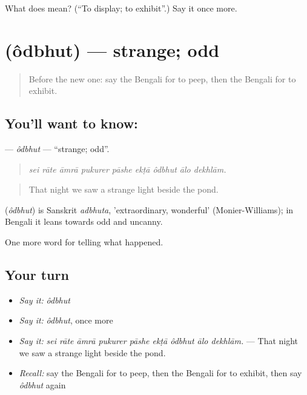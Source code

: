 \begin{tcolorbox}[breakable,colback=teal!4,colframe=teal!35!black,title={Before you move on}]
What does   mean? (\textquotedblleft{}To display; to exhibit\textquotedblright{}.) Say it once more.
\end{tcolorbox}
\section[\texorpdfstring{\bn{অদ্ভুত} (ôdbhut)}{অদ্ভুত (ôdbhut)}]{ (ôdbhut) — strange; odd}

\label{lesson:BN-C286-odbhut}



\begin{quote}
Before the new one: say the Bengali for to peep, then the Bengali for to exhibit.
\end{quote}

\subsection*{You'll want to know: }
\textbf{} — \emph{ôdbhut} — \textquotedblleft{}strange; odd\textquotedblright{}.

\begin{quote}
        
\end{quote}

\begin{quote}
\emph{sei rāte āmrā pukurer pāshe ekṭā ôdbhut ālo dekhlām.}
\end{quote}

\begin{quote}
That night we saw a strange light beside the pond.
\end{quote}

\begin{cousinweb}
\textbf{} (\emph{ôdbhut}) is Sanskrit \emph{adbhuta}, 'extraordinary, wonderful' (Monier-Williams); in Bengali it leans towards odd and uncanny.
\end{cousinweb}

\begin{grammarlens}[title={What you've built}]
One more word for telling what happened.
\end{grammarlens}

\subsection*{Your turn}
\begin{itemize}
\raggedright
  \item \emph{Say it:} \emph{ôdbhut}
  \item \emph{Say it:} \emph{ôdbhut}, once more
  \item \emph{Say it:} \emph{sei rāte āmrā pukurer pāshe ekṭā ôdbhut ālo dekhlām.} — That night we saw a strange light beside the pond.
  \item \emph{Recall:} say the Bengali for to peep, then the Bengali for to exhibit, then say \emph{ôdbhut} again
\end{itemize}


